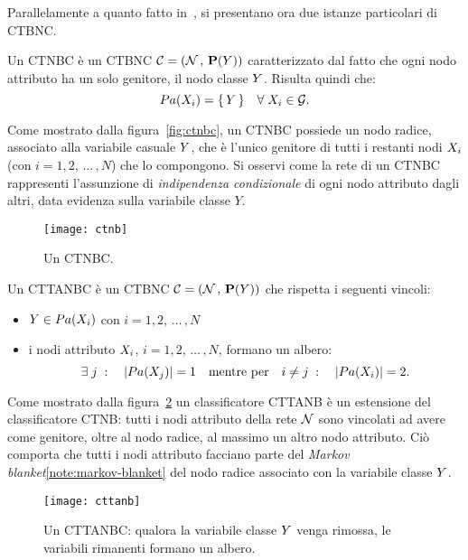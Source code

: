 Parallelamente a quanto fatto in~\citet{Langley1992}, si presentano ora due istanze particolari di \acl{CTBNC}.

\begin{definizione}\label{defn:ctnbc}
Un \acf{CTNBC} è un \acl{CTBNC} $\mathcal{C}=(\mathcal{N}\,,\,\mathbf{P}(\mathnormal{Y}))$ caratterizzato dal fatto che ogni nodo attributo ha un solo genitore, il nodo classe $\mathnormal{Y}$. Risulta quindi che:
\[
Pa(\mathnormal{X}_i)=\{\,\mathnormal{Y}\,\} \quad \forall \; \mathnormal{X}_i \in \mathcal{G}\text{.}
\]
\end{definizione}
Come mostrato dalla figura~\vref{fig:ctnbc}, un \acs{CTNBC} possiede un nodo radice, associato alla variabile casuale $\mathnormal{Y}$, che è l'unico genitore di tutti i restanti nodi $\mathnormal{X}_i$ (con $i=1,2,\,\dotsc\,,N$) che lo compongono. Si osservi come la rete di un \acs{CTNBC} rappresenti l'assunzione di \emph{indipendenza condizionale} di ogni nodo attributo dagli altri, data evidenza sulla variabile classe $Y$.

\begin{figure}[b]
\centering
\texttt{[image: ctnb]}
\caption[Un \acs{CTNBC}]{Un \acf{CTNBC}.}
\label{fig:ctnbc}
\end{figure}

\begin{definizione}\label{defn:cttanbc}
Un \acf{CTTANBC} è un \acl{CTBNC} $\mathcal{C}=(\mathcal{N}\,,\,\mathbf{P}(\mathnormal{Y}))$ che rispetta i seguenti vincoli:
\begin{itemize}
    \item $\mathnormal{Y} \in Pa(\mathnormal{X}_i)$ con $i=1,2,\,\dotsc\,,N$
    \item i nodi attributo $\mathnormal{X}_i$, $i=1,2,\,\dotsc\,,N$, formano un albero:
    \[
    \exists \; j \; : \quad |Pa(\mathnormal{X}_j)|=1 \quad \text{mentre per} \quad i \neq j \; : \quad |Pa(\mathnormal{X}_i)|=2\text{.}
    \]
\end{itemize}
\end{definizione}
Come mostrato dalla figura~\ref{fig:cttanbc} un classificatore \acs{CTTANB} è un estensione del classificatore \acs{CTNB}: tutti i nodi attributo della rete $\mathcal{N}$ sono vincolati ad avere come genitore, oltre al nodo radice, al massimo un altro nodo attributo. Ciò comporta che tutti i nodi attributo facciano parte del \emph{Markov blanket}\cref{note:markov-blanket} del nodo radice associato con la variabile classe $\mathnormal{Y}$.

\begin{figure}
\centering
\texttt{[image: cttanb]}
\caption[Un \acs{CTTANBC}]{Un \acf{CTTANBC}: qualora la variabile classe $\mathnormal{Y}$ venga rimossa, le variabili rimanenti formano un albero.}
\label{fig:cttanbc}
\end{figure}

